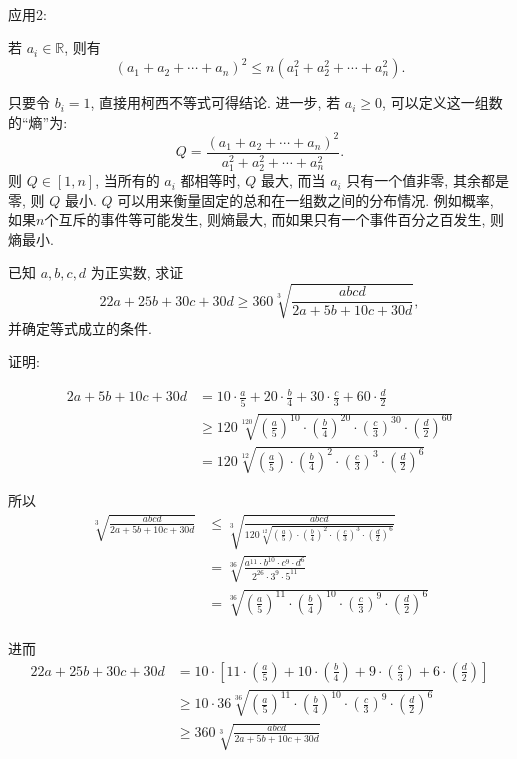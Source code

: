 ~

\noindent 应用2:

若 $a_i\in\mathbb{R}$, 则有
\[ (a_1+a_2+\cdots+a_n)^2 \le n(a_1^2+a_2^2+\cdots+a_n^2) .\]

只要令 $b_i=1$, 直接用柯西不等式可得结论. 进一步, 若 $a_i \ge 0$, 可以定义这一组数的``熵''为:
\[Q = \frac{(a_1+a_2+\cdots+a_n)^2}{a_1^2+a_2^2+\cdots+a_n^2} .\]
则 $Q\in[1,n]$, 当所有的 $a_i$ 都相等时, $Q$ 最大, 而当 $a_i$ 只有一个值非零, 其余都是零, 则 $Q$ 最小. $Q$ 可以用来衡量固定的总和在一组数之间的分布情况. 例如概率, 如果$n$个互斥的事件等可能发生, 则熵最大, 而如果只有一个事件百分之百发生, 则熵最小.

\newpage

已知 $a,b,c,d$ 为正实数, 求证
\[22a + 25b + 30c + 30d \ge 360 \sqrt[3]{\frac{abcd}{2a+5b+10c+30d}},\]
并确定等式成立的条件.

证明: 

\begin{align*}
2a+5b+10c+30d &=10\cdot\frac{a}{5}+20\cdot\frac{b}{4}+30\cdot\frac{c}{3}+60\cdot\frac{d}{2} \\
& \ge 120\sqrt[120]{\left(\frac{a}{5}\right)^{10}\cdot\left(\frac{b}{4}\right)^{20}\cdot\left(\frac{c}{3}\right)^{30}\cdot\left(\frac{d}{2}\right)^{60}}\\
&= 120\sqrt[12]{\left(\frac{a}{5}\right)\cdot\left(\frac{b}{4}\right)^2\cdot\left(\frac{c}{3}\right)^3\cdot\left(\frac{d}{2}\right)^6}
\end{align*}

所以
\begin{align*}
\sqrt[3]{\frac{abcd}{2a+5b+10c+30d}} &\le \sqrt[3]{\frac{abcd}{120\sqrt[12]{(\frac{a}{5})\cdot(\frac{b}{4})^2\cdot(\frac{c}{3})^3\cdot(\frac{d}{2})^6}}} \\
&= \sqrt[36]{\frac{a^{11}\cdot b^{10}\cdot c^9\cdot d^6}{2^{26}\cdot 3^9\cdot 5^{11}}} \\
&= \sqrt[36]{\left(\frac{a}{5}\right)^{11}\cdot\left(\frac{b}{4}\right)^{10}\cdot\left(\frac{c}{3}\right)^{9}\cdot\left(\frac{d}{2}\right)^6}\\
\end{align*}

进而
\begin{align*}
22a+25b+30c+30d &= 10\cdot\left[11\cdot(\frac{a}{5})+10\cdot(\frac{b}{4})+9\cdot(\frac{c}{3})+6\cdot(\frac{d}{2})\right] \\
&\ge 10\cdot 36\sqrt[36]{\left(\frac{a}{5}\right)^{11}\cdot\left(\frac{b}{4}\right)^{10}\cdot\left(\frac{c}{3}\right)^{9}\cdot\left(\frac{d}{2}\right)^6}\\
&\ge 360 \sqrt[3]{\frac{abcd}{2a+5b+10c+30d}}
\end{align*}

